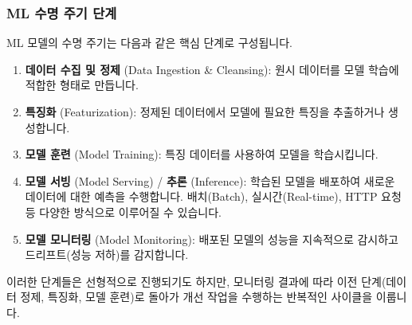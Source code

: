 \documentclass[11pt,a4paper]{article}
\theoremstyle{definition}
\begin{document}
\subsubsection*{ML 수명 주기 단계}
ML 모델의 수명 주기는 다음과 같은 핵심 단계로 구성됩니다.
\begin{enumerate}
    \item \textbf{데이터 수집 및 정제} (Data Ingestion \& Cleansing): 원시 데이터를 모델 학습에 적합한 형태로 만듭니다.
    \item \textbf{특징화} (Featurization): 정제된 데이터에서 모델에 필요한 특징을 추출하거나 생성합니다.
    \item \textbf{모델 훈련} (Model Training): 특징 데이터를 사용하여 모델을 학습시킵니다.
    \item \textbf{모델 서빙} (Model Serving) / \textbf{추론} (Inference): 학습된 모델을 배포하여 새로운 데이터에 대한 예측을 수행합니다. 배치(Batch), 실시간(Real-time), HTTP 요청 등 다양한 방식으로 이루어질 수 있습니다.
    \item \textbf{모델 모니터링} (Model Monitoring): 배포된 모델의 성능을 지속적으로 감시하고 드리프트(성능 저하)를 감지합니다.
\end{enumerate}
이러한 단계들은 선형적으로 진행되기도 하지만, 모니터링 결과에 따라 이전 단계(데이터 정제, 특징화, 모델 훈련)로 돌아가 개선 작업을 수행하는 반복적인 사이클을 이룹니다.
\end{document}
